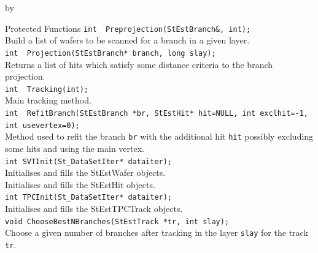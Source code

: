 \documentclass[twoside]{article}
\newcommand{\entrylabel}[1]{\mbox{\textbf{{#1}}}\hfil}%
\newenvironment{entry}
{\begin{list}{}%
    {\renewcommand{\makelabel}{\entrylabel}%
     \setlength{\labelwidth}{90pt}%
     \setlength{\leftmargin}{\labelwidth}
     \advance\leftmargin by \labelsep%
      }%
    }%
  {\end{list}}
\newcommand{\Entrylabel}[1]%
{\raisebox{0pt}[1ex][0pt]{\makebox[\labelwidth][l]%
    {\parbox[t]{\labelwidth}{\hspace{0pt}\textbf{{#1}}}}}}
\newenvironment{Entry}%
{\renewcommand{\entrylabel}{\Entrylabel}\begin{entry}}%
  {\end{entry}}
\begin{document}
\begin{Entry}
\item[Protected Functions]
	\verb+int  Preprojection(StEstBranch&, int);+\\
	Build a list of wafers to be scanned for a branch in a given layer.\\
	\verb+int  Projection(StEstBranch* branch, long slay);+\\
	Returns a list of hits which satisfy some distance criteria to the branch projection.\\
	\verb+int  Tracking(int);+\\
	Main tracking method.\\
	\verb+int  RefitBranch(StEstBranch *br, StEstHit* hit=NULL, int exclhit=-1, int usevertex=0);+\\
	Method used to refit the branch \verb+br+ with the additional hit \verb+hit+ possibly excluding some hits and using the main vertex.\\ 
	\verb+int SVTInit(St_DataSetIter* dataiter);+\\
	Initialises and fills the StEstWafer objects. \\
	Initialises and fills the StEstHit objects. \\
	\verb+int TPCInit(St_DataSetIter* dataiter);+\\
	Initialises and fills the StEstTPCTrack objects. \\
	\verb+void ChooseBestNBranches(StEstTrack *tr, int slay);+\\
	Choose a given number of branches after tracking in the layer \verb+slay+ for the track \verb+tr+.\\
\end{Entry}

%
%
\end{document}
